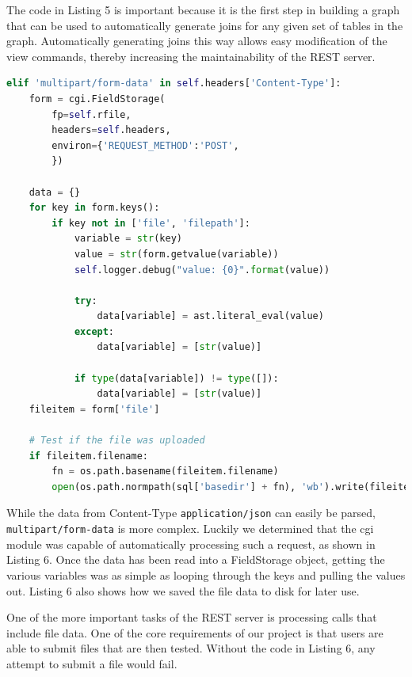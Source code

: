 \documentclass[10pt,draftclsnofoot,onecolumn]{IEEEtran}
\begin{document}
The code in Listing 5 is important because it is the first step in building a
graph that can be used to automatically generate joins for any given set of
tables in the graph. Automatically generating joins this way allows easy
modification of the view commands, thereby increasing the maintainability of
the REST server.

\begin{lstlisting}[language=Python, caption=Processing a multipart/form-data HTTP request using cgi.FieldStorage and saving a file to disk]
elif 'multipart/form-data' in self.headers['Content-Type']:
	form = cgi.FieldStorage(
		fp=self.rfile,
		headers=self.headers,
		environ={'REQUEST_METHOD':'POST',
		})

	data = {}
	for key in form.keys():
		if key not in ['file', 'filepath']:
			variable = str(key)
			value = str(form.getvalue(variable))
			self.logger.debug("value: {0}".format(value))

			try:
				data[variable] = ast.literal_eval(value)
			except:
				data[variable] = [str(value)]

			if type(data[variable]) != type([]):
				data[variable] = [str(value)]
	fileitem = form['file']

	# Test if the file was uploaded
	if fileitem.filename:
		fn = os.path.basename(fileitem.filename)
		open(os.path.normpath(sql['basedir'] + fn), 'wb').write(fileitem.file.read())
\end{lstlisting}
While the data from Content-Type \texttt{application/json} can easily be parsed,
\texttt{multipart/form-data} is more complex. Luckily we determined that the cgi
module was capable of automatically processing such a request, as shown in
Listing 6. Once the data has been read into a FieldStorage object, getting the
various variables was as simple as looping through the keys and pulling the
values out. Listing 6 also shows how we saved the file data to disk for later
use.

One of the more important tasks of the REST server is processing calls that
include file data. One of the core requirements of our project is that users
are able to submit files that are then tested. Without the code in Listing 6,
any attempt to submit a file would fail.
\end{document}
